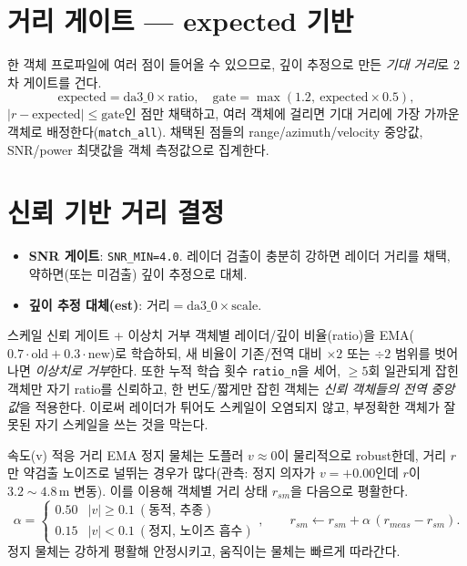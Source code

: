 \section{거리 게이트 — expected 기반}
한 객체 프로파일에 여러 점이 들어올 수 있으므로, 깊이 추정으로 만든
\emph{기대 거리}로 2차 게이트를 건다.
\[
  \text{expected} = \text{da3\_0}\times\text{ratio},\quad
  \text{gate} = \max(1.2,\ \text{expected}\times 0.5),
\]
$|r-\text{expected}|\le\text{gate}$인 점만 채택하고, 여러 객체에 걸리면 기대 거리에
가장 가까운 객체로 배정한다(\texttt{match\_all}). 채택된 점들의 range/azimuth/velocity
중앙값, SNR/power 최댓값을 객체 측정값으로 집계한다.

\section{신뢰 기반 거리 결정}
\begin{itemize}
  \item \textbf{SNR 게이트}: \texttt{SNR\_MIN=4.0}. 레이더 검출이 충분히 강하면
        레이더 거리를 채택, 약하면(또는 미검출) 깊이 추정으로 대체.
  \item \textbf{깊이 추정 대체(est)}: $\text{거리} = \text{da3\_0}\times\text{scale}$.
\end{itemize}

\begin{designbox}{스케일 신뢰 게이트 + 이상치 거부}
객체별 레이더/깊이 비율(ratio)을 EMA($0.7\cdot\text{old}+0.3\cdot\text{new}$)로 학습하되,
새 비율이 기존/전역 대비 $\times2$ 또는 $\div2$ 범위를 벗어나면 \emph{이상치로 거부}한다.
또한 누적 학습 횟수 \texttt{ratio\_n}을 세어, $\ge 5$회 일관되게 잡힌 객체만 자기 ratio를
신뢰하고, 한 번도/짧게만 잡힌 객체는 \emph{신뢰 객체들의 전역 중앙값}을 적용한다.
이로써 레이더가 튀어도 스케일이 오염되지 않고, 부정확한 객체가 잘못된 자기 스케일을
쓰는 것을 막는다.
\end{designbox}

\begin{designbox}{속도(v) 적응 거리 EMA}
정지 물체는 도플러 $v\approx 0$이 물리적으로 robust한데, 거리 $r$만 약검출
노이즈로 널뛰는 경우가 많다(관측: 정지 의자가 $v=+0.00$인데 $r$이 $3.2\sim4.8$\,m
변동). 이를 이용해 객체별 거리 상태 $r_{sm}$을 다음으로 평활한다.
\[
  \alpha = \begin{cases}0.50 & |v|\ge 0.1 \ (\text{동적, 추종})\\
                         0.15 & |v|<0.1 \ (\text{정지, 노이즈 흡수})\end{cases},\qquad
  r_{sm}\leftarrow r_{sm}+\alpha\,(r_{meas}-r_{sm}).
\]
정지 물체는 강하게 평활해 안정시키고, 움직이는 물체는 빠르게 따라간다.
\end{designbox}

